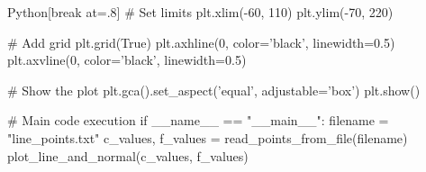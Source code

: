 \documentclass{beamer}
\theoremstyle{remark}
\numberwithin{equation}{section}
\begin{document}
\begin{frame}
\begin{mintedbox}{Python}[break at=.8\textheight]
    # Set limits
    plt.xlim(-60, 110)
    plt.ylim(-70, 220)

    # Add grid
    plt.grid(True)
    plt.axhline(0, color='black', linewidth=0.5)
    plt.axvline(0, color='black', linewidth=0.5)

    # Show the plot
    plt.gca().set_aspect('equal', adjustable='box')
    plt.show()

# Main code execution
if __name__ == "__main__":
    filename = "line_points.txt"
    c_values, f_values = read_points_from_file(filename)
    plot_line_and_normal(c_values, f_values)

\end{mintedbox}
\end{frame}
\end{document}
